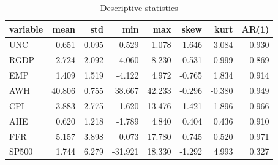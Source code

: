\begin{table}[htbp]
\centering
\caption{Descriptive statistics}
\label{tab:desc}
\begin{tabular}{lrrrrrrr}
\toprule
variable & mean & std & min & max & skew & kurt & AR(1) \\
\midrule
UNC & 0.651 & 0.095 & 0.529 & 1.078 & 1.646 & 3.084 & 0.930 \\
RGDP & 2.724 & 2.092 & -4.060 & 8.230 & -0.531 & 0.999 & 0.869 \\
EMP & 1.409 & 1.519 & -4.122 & 4.972 & -0.765 & 1.834 & 0.914 \\
AWH & 40.806 & 0.755 & 38.667 & 42.233 & -0.296 & -0.380 & 0.949 \\
CPI & 3.883 & 2.775 & -1.620 & 13.476 & 1.421 & 1.896 & 0.966 \\
AHE & 0.620 & 1.218 & -1.789 & 4.840 & 0.404 & 0.436 & 0.910 \\
FFR & 5.157 & 3.898 & 0.073 & 17.780 & 0.745 & 0.520 & 0.971 \\
SP500 & 1.744 & 6.279 & -31.921 & 18.330 & -1.292 & 4.993 & 0.327 \\
\bottomrule
\end{tabular}
\end{table}